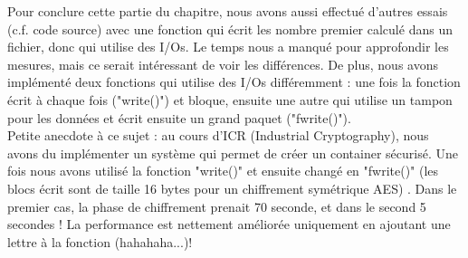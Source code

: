 Pour conclure cette partie du chapitre, nous avons aussi effectué d'autres essais (c.f. code source) avec une fonction qui écrit les nombre premier calculé dans un fichier, donc qui utilise des I/Os. Le temps nous a manqué pour approfondir les mesures, mais ce serait intéressant de voir les différences. De plus, nous avons implémenté deux fonctions qui utilise des I/Os différemment : une fois la fonction écrit à chaque fois ("write()") et bloque, ensuite une autre qui utilise un tampon pour les données et écrit ensuite un grand paquet ("fwrite()").\\

Petite anecdote à ce sujet : au cours d'ICR (Industrial Cryptography), nous avons du implémenter un système qui permet de créer un container sécurisé. Une fois nous avons utilisé la fonction "write()" et ensuite changé en "fwrite()" (les blocs écrit sont de taille 16 bytes pour un chiffrement symétrique AES) . Dans le premier cas, la phase de chiffrement prenait 70 seconde, et dans le second 5 secondes ! La performance est nettement améliorée uniquement en ajoutant une lettre à la fonction (hahahaha...)!

